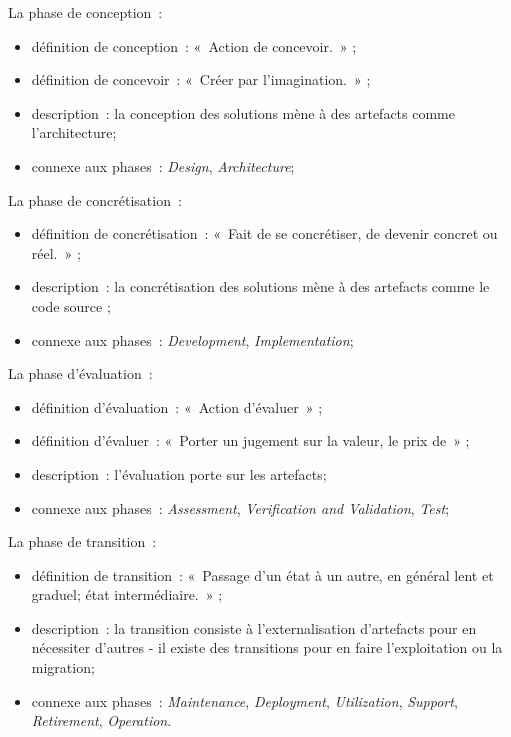 {La phase de conception~:
\begin{itemize}
    \item définition de conception~: «~Action de concevoir.~» \cite{Robert_conception_0} ;
    \item définition de concevoir~: «~Créer par l'imagination.~» \cite{Robert_concevoir_0};
    \item description~: la conception des solutions mène à des artefacts comme l'architecture;
    \item connexe aux phases~: \textit{Design}, \textit{Architecture};
\end{itemize}

La phase de concrétisation~:
\begin{itemize}
    \item définition de concrétisation~: «~Fait de se concrétiser, de devenir concret ou réel.~» \cite{Robert_concretisation_0} ;
    \item description~: la concrétisation des solutions mène à des artefacts comme le code source ;
    \item connexe aux phases~: \textit{Development}, \textit{Implementation};
\end{itemize}

La phase d’évaluation~:
\begin{itemize}
    \item définition d'évaluation~: «~Action d'évaluer~» \cite{Robert_evaluation_0} ;
    \item définition d'évaluer~: «~Porter un jugement sur la valeur, le prix de~» \cite{ Robert_evaluer_0};
    \item description~: l'évaluation porte sur les artefacts;
    \item connexe aux phases~: \textit{Assessment}, \textit{Verification and Validation}, \textit{Test};
\end{itemize}

La phase de transition~:
\begin{itemize}
    \item définition de transition~:  «~Passage d'un état à un autre, en général lent et graduel; état intermédiaire.~» \cite{Robert_transition_0} ;
    \item description~: la transition consiste à l'externalisation d'artefacts pour en nécessiter d'autres - il existe des transitions pour en faire l'exploitation ou la migration;
    \item connexe aux phases~: \textit{Maintenance}, \textit{Deployment}, \textit{Utilization}, \textit{Support}, \textit{Retirement}, \textit{Operation}.
\end{itemize}
\vspace{-1\baselineskip}
}{}

